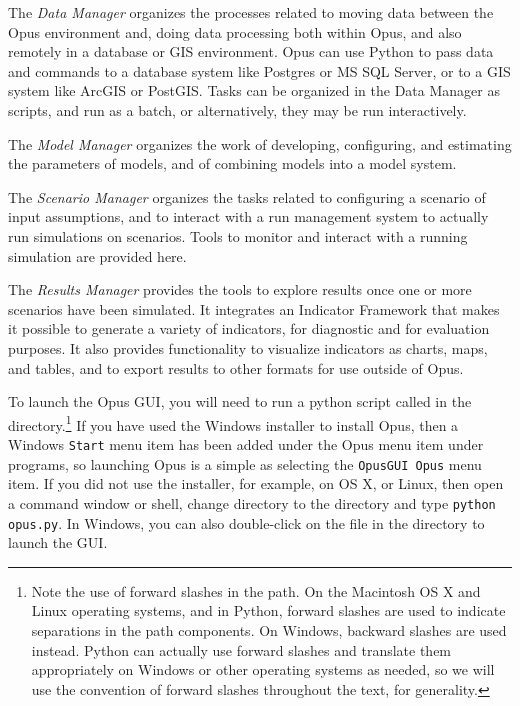 \squishlist
\item The \emph{Data Manager} organizes the processes related to moving data between the Opus environment and, doing data processing both within Opus, and also remotely in a database or GIS environment.  Opus can use Python to pass data and commands to a database system like Postgres or MS SQL Server, or to a GIS system like ArcGIS or PostGIS.  Tasks can be organized in the Data Manager as scripts, and run as a batch, or alternatively, they may be run interactively.
\item The \emph{Model Manager} organizes the work of developing, configuring, and estimating the parameters of models, and of combining models into a model system.
\item The \emph{Scenario Manager} organizes the tasks related to configuring a scenario of input assumptions, and to interact with a run management system to actually run simulations on scenarios.  Tools to monitor and interact with a running simulation are provided here.
\item The \emph{Results Manager} provides the tools to explore results once one or more scenarios have been simulated.  It integrates an Indicator Framework that makes it possible to generate a variety of indicators, for diagnostic and for evaluation purposes.  It also provides functionality to visualize indicators as charts, maps, and tables, and to export results to other formats for use outside of Opus.
\squishend

To launch the Opus GUI, you will need to run a python script called
 in the  directory.\footnote{Note
  the use of forward slashes in the path.  On the Macintosh OS X and Linux
  operating systems, and in Python, forward slashes are used to indicate
  separations in the path components.  On Windows, backward slashes are
  used instead.  Python can actually use forward slashes and translate them
  appropriately on Windows or other operating systems as needed, so we will
  use the convention of forward slashes throughout the text, for
  generality.}  If you have used the Windows installer to install Opus,
then a Windows \texttt{Start} menu item has been added under the Opus menu
item under programs, so launching Opus is a simple as selecting the
\texttt{OpusGUI Opus} menu item.  If you did not use the installer, for
example, on OS X, or Linux, then open a command window or shell, change
directory to the  directory and type \texttt{python
  opus.py}.  In Windows, you can also double-click on the 
file in the  directory to launch the GUI.

